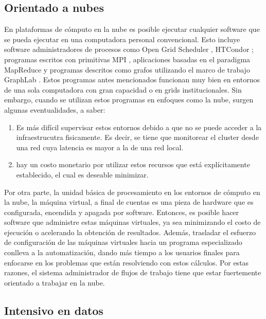 \subsection{Orientado a nubes}

En plataformas de c\'omputo en la nube es posible ejecutar cualquier software que se pueda ejecutar en una computadora personal convencional. Esto incluye software administradores de procesos como Open Grid Scheduler \cite{univa2016gridengine}, HTCondor \cite{htcondor2014webpage}; programas escritos con primitivas MPI \cite{mpiforum2016mpi}, aplicaciones basadas en el paradigma MapReduce \cite{dean2008mapreduce} y programas descritos como grafos utilizando el marco de trabajo GraphLab \cite{low2014graphlab}. Estos programas antes mencionados funcionan muy bien en entornos de una sola computadora con gran capacidad o en grids institucionales. Sin embargo, cuando se utilizan estos programas en enfoques como la nube, surgen algunas eventualidades, a saber:

\begin{enumerate}
\item Es más difícil supervisar estos entornos debido a que no se puede acceder a la infraestrucutra fisicamente. Es decir, se tiene que monitorear el cluster desde una red cuya latencia es mayor a la de una red local. 

\item hay un costo monetario por utilizar estos recursos que está explícitamente establecido, el cual es deseable minimizar. 
\end{enumerate}

Por otra parte, la unidad b\'asica de procesamiento en los entornos de c\'omputo en la nube, la m\'aquina virtual, a final de cuentas es una pieza de hardware que es configurada, encendida y apagada por software. Entonces, es posible hacer software que administre estas m\'aquinas virtuales, ya sea minimizando el costo de ejecuci\'on o acelerando la obtenci\'on de resultados. Adem\'as, trasladar el esfuerzo de configuraci\'on de las m\'aquinas virtuales hacia un programa especializado conlleva a la automatizaci\'on, dando m\'as tiempo a los usuarios finales para enfocarse en los problemas que est\'an resolviendo con estos c\'alculos. Por estas razones, el sistema administrador de flujos de trabajo tiene que estar fuertemente orientado a trabajar en la nube.


\subsection{Intensivo en datos}

